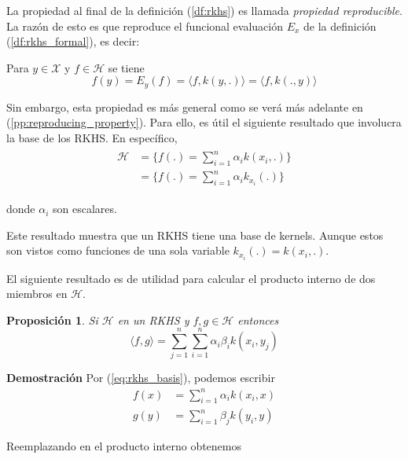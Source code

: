 \documentclass{article}
\numberwithin{equation}{section}
\newtheorem{proposition}{Proposición}
\theoremstyle{remark}
\theoremstyle{definition}
\theoremstyle{remark}
\theoremstyle{remark}
\begin{document}
La propiedad al final de la definición (\ref{df:rkhs}) es llamada \textit{propiedad reproducible}.
La razón de esto es que reproduce el funcional evaluación $E_x$ de la definición (\ref{df:rkhs_formal}), 
es decir:

Para $y \in \mathcal{X}$ y $f \in \mathcal{H}$ se tiene 
\begin{equation}
\label{eq:reproducing_property}    
f(y) = E_y(f) = \langle f, k(y, .) \rangle = \langle f, k(., y) \rangle
\end{equation}

Sin embargo, esta propiedad es más general como se verá más adelante en (\ref{pp:reproducing_property}).
Para ello, es útil el siguiente resultado que involucra la base de los RKHS. En específico,
\begin{align}
\label{eq:rkhs_basis}
    \begin{split}
        \mathcal{H} &= \{f(.) = \sum_{i = 1}^n \alpha_i k(x_i, .)\} \\
                    &= \{f(.) = \sum_{i = 1}^n \alpha_i k_{x_i}(.)\}
    \end{split}
\end{align}

donde $\alpha_i$ son escalares.

Este  resultado muestra que un RKHS tiene una base de kernels. Aunque
estos son vistos como funciones de una sola variable $k_{x_i}(.) = k(x_i, .)$.

El siguiente resultado es de utilidad para calcular el producto interno de dos miembros en
$\mathcal{H}$.

\begin{proposition}
    \label{pp:inner_product_rkhs}
    Si $\mathcal{H}$ en un RKHS y $f, g \in \mathcal{H}$ entonces
    $$\langle f, g \rangle = \sum_{j = 1}^n \sum_{i = 1}^n \alpha_i \beta_i k(x_i, y_j)$$
\end{proposition}

\textbf{Demostración}
Por (\ref{eq:rkhs_basis}), podemos escribir
\begin{align*}
f(x) &= \sum_{i=1}^n \alpha_i k(x_i, x)\\
g(y) &= \sum_{i=1}^n \beta_j k(y_i, y)
\end{align*}

Reemplazando en el producto interno obtenemos
\end{document}
